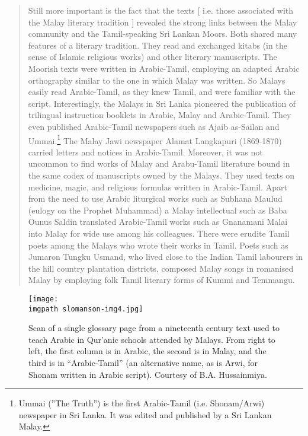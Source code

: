 \begin{quote}
 Still more important is the fact that the texts [ i.e. those associated with the Malay literary tradition ] revealed the strong links between the Malay community and the Tamil-speaking Sri Lankan Moors. Both shared many features of a literary tradition. They read and exchanged kitabs (in the sense of Islamic religious works) and other literary manuscripts. The Moorish texts were written in Arabic-Tamil, employing an adapted Arabic orthography similar to the one in which Malay was written. So Malays easily read Arabic-Tamil, as they knew Tamil, and were familiar with the script. Interestingly, the Malays in Sri Lanka pioneered the publication of trilingual instruction booklets in Arabic, Malay and Arabic-Tamil. They even published Arabic-Tamil newspapers such as Ajaib as-Sailan and Ummai.\footnote{Ummai
  (''The Truth'') is the first Arabic-Tamil (i.e. Shonam/Arwi) newspaper in Sri Lanka. It was edited and published by a Sri Lankan Malay.}
The Malay Jawi newspaper Alamat Langkapuri (1869-1870) carried letters and notices in Arabic-Tamil. Moreover, it was not uncommon to find works of Malay and Arabu-Tamil literature bound in the same codex of manuscripts owned by the Malays. They used texts on medicine, magic, and religious formulas written in Arabic-Tamil. Apart from the need to use Arabic liturgical works such as Subhana Maulud (eulogy on the Prophet Muhammad) a Malay intellectual such as Baba Ounus Saldin translated Arabic-Tamil works such as Gnanamani Malai into Malay for wide use among his colleagues. There were erudite Tamil poets among the Malays who wrote their works in Tamil. Poets such as Jumaron Tungku Usmand, who lived close to the Indian Tamil labourers in the hill country plantation districts, composed Malay songs in romanised Malay by employing folk Tamil literary forms of Kummi and Temmangu.
\end{quote}
 
\begin{figure}
\texttt{[image: \\imgpath slomanson-img4.jpg]}
\caption[Glossary page from a nineteenth century text used to teach Arabic in Qur'anic schools attended by Malays]{Scan of a single glossary page from a nineteenth century text used to teach Arabic in Qur'anic schools attended by Malays. From right to left, the first column is in Arabic, the second is in Malay, and the third is in ``Arabic-Tamil'' (an alternative name, as is Arwi, for Shonam written in Arabic script). Courtesy of B.A. Hussainmiya.}
\end{figure}
 



